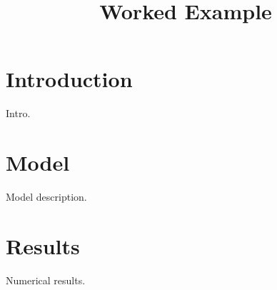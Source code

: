 \documentclass[article]{jss}
\title{Worked Example}
\begin{document}
\section{Introduction}
Intro.
\section{Model}
Model description.
\section{Results}
Numerical results.

\end{document}

